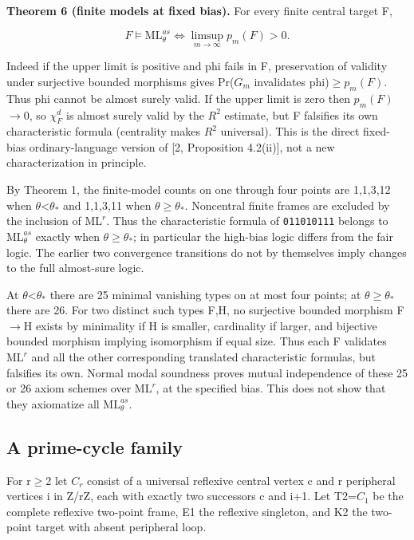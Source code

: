 \documentclass[11pt]{article}
\begin{document}
\textbf{Theorem 6 (finite models at fixed bias).} For every finite central target F,

\[
F\models\mathrm{ML}^{as}_\theta\iff\limsup_{m\to\infty}p_m(F)>0.
\]

Indeed if the upper limit is positive and phi fails in F, preservation of validity under surjective bounded morphisms gives Pr($G_{m}$ invalidates phi)\ensuremath{\geq}$p_m(F)$. Thus phi cannot be almost surely valid. If the upper limit is zero then $p_m(F)$\ensuremath{\to}0, so $\chi_{F}^{d}$ is almost surely valid by the $R^{2}$ estimate, but F falsifies its own characteristic formula (centrality makes $R^{2}$ universal). This is the direct fixed-bias ordinary-language version of [2, Proposition 4.2(ii)], not a new characterization in principle.

By Theorem 1, the finite-model counts on one through four points are 1,1,3,12 when $\theta$<$\theta_{*}$ and 1,1,3,11 when $\theta$\ensuremath{\geq}$\theta_{*}$. Noncentral finite frames are excluded by the inclusion of $\mathrm{ML}^r$. Thus the characteristic formula of \texttt{011010111} belongs to $\mathrm{ML}^{as}_\theta$ exactly when $\theta$\ensuremath{\geq}$\theta_{*}$; in particular the high-bias logic differs from the fair logic. The earlier two convergence transitions do not by themselves imply changes to the full almost-sure logic.

At $\theta$<$\theta_{*}$ there are 25 minimal vanishing types on at most four points; at $\theta$\ensuremath{\geq}$\theta_{*}$ there are 26. For two distinct such types F,H, no surjective bounded morphism F\ensuremath{\to}H exists by minimality if H is smaller, cardinality if larger, and bijective bounded morphism implying isomorphism if equal size. Thus each F validates $\mathrm{ML}^r$ and all the other corresponding translated characteristic formulas, but falsifies its own. Normal modal soundness proves mutual independence of these 25 or 26 axiom schemes over $\mathrm{ML}^r$, at the specified bias. This does not show that they axiomatize all $\mathrm{ML}^{as}_\theta$.

\subsection{A prime-cycle family}

For r\ensuremath{\geq}2 let $C_{r}$ consist of a universal reflexive central vertex c and r peripheral vertices i in Z/rZ, each with exactly two successors c and i+1. Let T2=$C_{1}$ be the complete reflexive two-point frame, E1 the reflexive singleton, and K2 the two-point target with absent peripheral loop.
\end{document}
